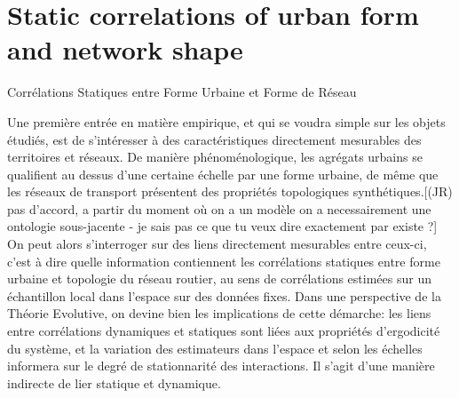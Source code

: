 

\newpage





\section[Static Correlations][Corrélations Statiques]{Static correlations of urban form and network shape}{Corrélations Statiques entre Forme Urbaine et Forme de Réseau}

\label{sec:staticcorrelations}





Une première entrée en matière empirique, et qui se voudra simple sur les objets étudiés, est de s'intéresser à des caractéristiques directement mesurables des territoires et réseaux. De manière phénoménologique, les agrégats urbains se qualifient au dessus d'une certaine échelle par une forme urbaine, de même que les réseaux de transport présentent des propriétés topologiques synthétiques.[(JR) pas d'accord, a partir du moment où on a un modèle on a necessairement une ontologie sous-jacente - je sais pas ce que tu veux dire exactement par existe ?] On peut alors s'interroger sur des liens directement mesurables entre ceux-ci, c'est à dire quelle information contiennent les corrélations statiques entre forme urbaine et topologie du réseau routier, au sens de corrélations estimées sur un échantillon local dans l'espace sur des données fixes. Dans une perspective de la Théorie Evolutive, on devine bien les implications de cette démarche: les liens entre corrélations dynamiques et statiques sont liées aux propriétés d'ergodicité du système, et la variation des estimateurs dans l'espace et selon les échelles informera sur le degré de stationnarité des interactions. Il s'agit d'une manière indirecte de lier statique et dynamique. 






